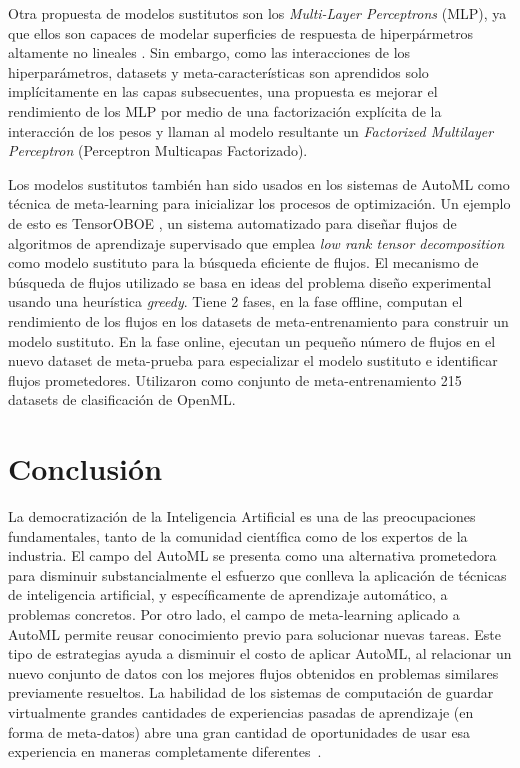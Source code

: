 Otra propuesta de modelos sustitutos son los \textit{Multi-Layer Perceptrons} (MLP), ya que ellos son capaces de modelar superficies de respuesta de hiperpármetros altamente no lineales \cite{schilling2015hyp}. Sin embargo, como las interacciones de los hiperparámetros, datasets y meta-características son aprendidos solo implícitamente en las capas subsecuentes, una propuesta es mejorar el rendimiento de los MLP por medio de una factorización explícita de la interacción de los pesos y llaman al modelo resultante un \textit{Factorized Multilayer Perceptron} (Perceptron Multicapas Factorizado).

Los modelos sustitutos también han sido usados en los sistemas de AutoML como técnica de meta-learning para inicializar los procesos de optimización. Un ejemplo de esto es TensorOBOE \cite{yang2020automl}, un sistema automatizado para diseñar flujos de algoritmos de aprendizaje supervisado que emplea \textit{low rank tensor decomposition} como modelo sustituto para la búsqueda eficiente de flujos. El mecanismo de búsqueda de flujos utilizado se basa en ideas del problema diseño experimental \cite{borkowski1994optimal, makar2011teaching} usando una heurística \textit{greedy}. Tiene 2 fases, en la fase offline, computan el rendimiento de los flujos en los datasets de meta-entrenamiento para construir un modelo sustituto. En la fase online, ejecutan un pequeño número de flujos en el nuevo dataset de meta-prueba para especializar el modelo sustituto e identificar flujos prometedores. Utilizaron como conjunto de meta-entrenamiento 215 datasets de clasificación de OpenML.


\section{Conclusión}\label{sec:conclusion}

La democratización de la Inteligencia Artificial es una de las preocupaciones fundamentales, tanto de la comunidad científica como de los expertos de la industria. El campo del AutoML se presenta como una alternativa prometedora para disminuir substancialmente el esfuerzo que conlleva la aplicación de técnicas de inteligencia artificial, y específicamente de aprendizaje automático, a problemas concretos. Por otro lado, el campo de meta-learning aplicado a AutoML permite reusar conocimiento previo para solucionar nuevas tareas. Este tipo de estrategias ayuda a disminuir el costo de aplicar AutoML, al relacionar un nuevo conjunto de datos con los mejores flujos obtenidos en problemas similares previamente resueltos. La habilidad de los sistemas de computación de guardar virtualmente grandes cantidades de experiencias pasadas de aprendizaje (en forma de meta-datos) abre una gran cantidad de oportunidades de usar esa experiencia en maneras completamente diferentes~\cite{vanschoren2018metalearning}.

